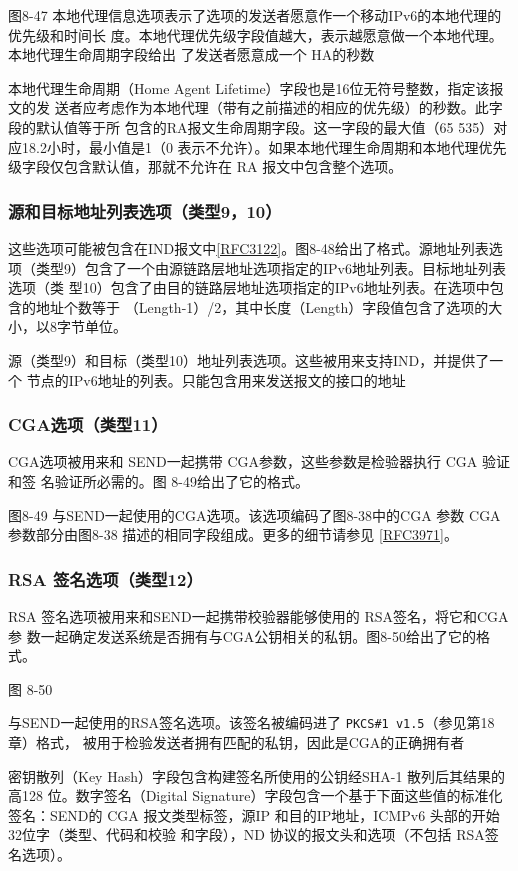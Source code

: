 图8-47 本地代理信息选项表示了选项的发送者愿意作一个移动IPv6的本地代理的优先级和时间长
度。本地代理优先级字段值越大，表示越愿意做一个本地代理。本地代理生命周期字段给出
了发送者愿意成一个 HA的秒数

本地代理生命周期（Home Agent Lifetime）字段也是16位无符号整数，指定该报文的发
送者应考虑作为本地代理（带有之前描述的相应的优先级）的秒数。此字段的默认值等于所
包含的RA报文生命周期字段。这一字段的最大值（65 535）对应18.2小时，最小值是1（0
表示不允许）。如果本地代理生命周期和本地代理优先级字段仅包含默认值，那就不允许在
RA 报文中包含整个选项。

\subsubsection{源和目标地址列表选项（类型9，10）}
这些选项可能被包含在IND报文中\href{https://www.rfc-editor.org/rfc/rfc3122}{[RFC3122]}。图8-48给出了格式。源地址列表选
项（类型9）包含了一个由源链路层地址选项指定的IPv6地址列表。目标地址列表选项（类
型10）包含了由目的链路层地址选项指定的IPv6地址列表。在选项中包含的地址个数等于
（Length-1）/2，其中长度（Length）字段值包含了选项的大小，以8字节单位。

源（类型9）和目标（类型10）地址列表选项。这些被用来支持IND，并提供了一个
节点的IPv6地址的列表。只能包含用来发送报文的接口的地址

\subsubsection{CGA选项（类型11）}
CGA选项被用来和 SEND一起携带 CGA参数，这些参数是检验器执行 CGA 验证和签
名验证所必需的。图 8-49给出了它的格式。

图8-49 与SEND一起使用的CGA选项。该选项编码了图8-38中的CGA 参数
CGA 参数部分由图8-38 描述的相同字段组成。更多的细节请参见 \href{https://www.rfc-editor.org/rfc/rfc3971}{[RFC3971]}。

\subsubsection{RSA 签名选项（类型12）}
RSA 签名选项被用来和SEND一起携带校验器能够使用的 RSA签名，将它和CGA参
数一起确定发送系统是否拥有与CGA公钥相关的私钥。图8-50给出了它的格式。


图 8-50

与SEND一起使用的RSA签名选项。该签名被编码进了 \verb|PKCS#1 v1.5|（参见第18章）格式，
被用于检验发送者拥有匹配的私钥，因此是CGA的正确拥有者

密钥散列（Key Hash）字段包含构建签名所使用的公钥经SHA-1 散列后其结果的高128
位。数字签名（Digital Signature）字段包含一个基于下面这些值的标准化签名：SEND的
CGA 报文类型标签，源IP 和目的IP地址，ICMPv6 头部的开始32位字（类型、代码和校验
和字段），ND 协议的报文头和选项（不包括 RSA签名选项）。

